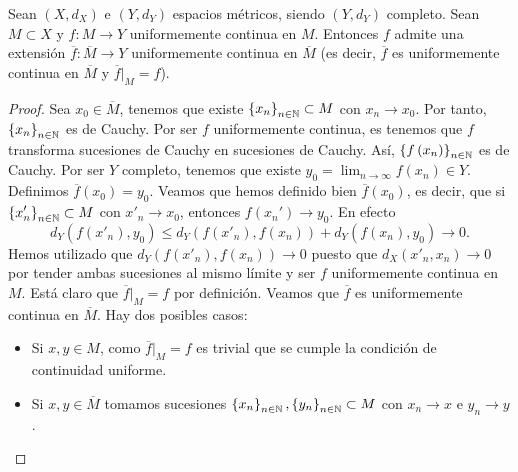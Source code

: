 \begin{theorem}
Sean $\displaystyle \left(X,d _{X}\right) $ e $\displaystyle \left(Y, d _{Y}\right) $ espacios métricos, siendo $\displaystyle \left(Y, d _{Y}\right) $ completo. Sean $\displaystyle M \subset X $ y $\displaystyle f : M \to Y $ uniformemente continua en $\displaystyle M $. Entonces $\displaystyle f $ admite una extensión $\displaystyle \overline{f} : \overline{M} \to Y $ uniformemente continua en $\displaystyle \overline{M} $ (es decir, $\displaystyle \overline{f} $ es uniformemente continua en $\displaystyle \overline{M} $ y $\displaystyle \overline{f}|_{M} = f $).
\end{theorem}
\begin{proof}
	Sea $\displaystyle x_{0} \in \overline{M} $, tenemos que existe $\displaystyle \left\{ x_{n}\right\} _{n\in\mathbb{N}} \subset M $ con $\displaystyle x_{n} \to x_{0} $. Por tanto, $\displaystyle \left\{ x_{n}\right\} _{n\in\mathbb{N}} $ es de Cauchy. Por ser $\displaystyle f $ uniformemente continua, es tenemos que $\displaystyle f $ transforma sucesiones de Cauchy en sucesiones de Cauchy. Así, $\displaystyle \left\{ f\left(x_{n}\right)\right\} _{n\in\mathbb{N}} $ es de Cauchy. Por ser $\displaystyle Y $ completo, tenemos que existe $\displaystyle y_{0} = \lim_{n \to \infty}f\left(x_{n}\right) \in Y $. Definimos $\displaystyle \overline{f}\left(x_{0}\right) = y_{0} $.
	Veamos que hemos definido bien $\displaystyle \overline{f}\left(x_{0}\right) $, es decir, que si $\displaystyle \left\{ x'_{n}\right\} _{n\in\mathbb{N}} \subset M $ con $\displaystyle x'_{n} \to x_{0} $, entonces $\displaystyle f\left(x_{n}'\right) \to y_{0} $. En efecto
	\[d _{Y}\left(f\left(x'_{n}\right), y_{0}\right) \leq d _{Y}\left(f\left(x'_{n}\right), f\left(x_{n}\right)\right) + d _{Y}\left(f\left(x_{n}\right), y_{0}\right) \to 0 .\]
Hemos utilizado que $\displaystyle d _{Y}\left(f\left(x'_{n}\right), f\left(x_{n}\right)\right) \to 0 $ puesto que $\displaystyle d _{X}\left(x'_{n}, x_{n}\right) \to 0 $ por tender ambas sucesiones al mismo límite y ser $\displaystyle f $ uniformemente continua en $\displaystyle M $. 
Está claro que $\displaystyle \overline{f}|_{M} = f $ por definición. Veamos que $\displaystyle \overline{f} $ es uniformemente continua en $\displaystyle \overline{M} $. Hay dos posibles casos:
\begin{itemize}
\item Si $\displaystyle x,y \in M $, como $\displaystyle \overline{f}|_{M} = f $ es trivial que se cumple la condición de continuidad uniforme. 
\item Si $\displaystyle x,y \in \overline{M} $ tomamos sucesiones $\displaystyle \left\{ x_{n}\right\} _{n\in\mathbb{N}}, \left\{ y_{n}\right\} _{n\in\mathbb{N}} \subset M $ con $\displaystyle x_{n}\to x $ e $\displaystyle y_{n} \to y $. 

\end{itemize}
\end{proof}
